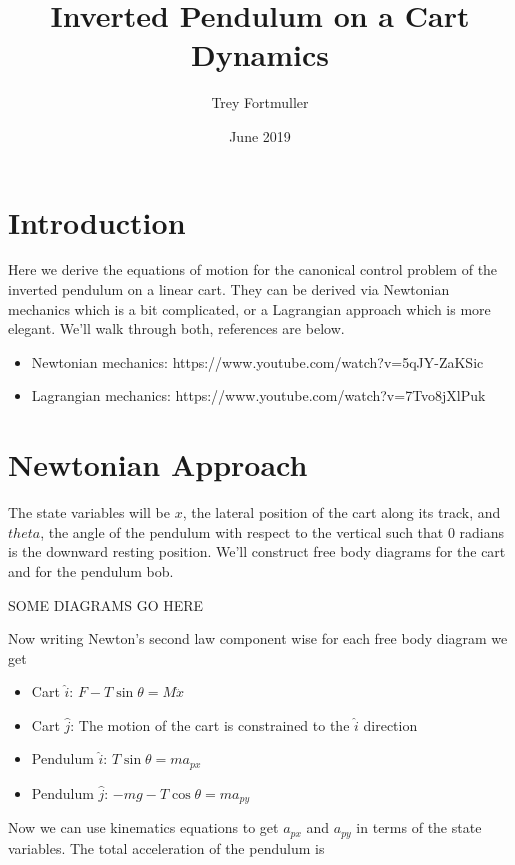 \documentclass{article}
\title{Inverted Pendulum on a Cart Dynamics}
\author{Trey Fortmuller}
\date{June 2019}
\begin{document}
\maketitle

\section*{Introduction}

Here we derive the equations of motion for the canonical control problem of the inverted pendulum on a linear cart. They can be derived via Newtonian mechanics which is a bit complicated, or a Lagrangian approach which is more elegant. We'll walk through both, references are below.

\begin{itemize}
    \item Newtonian mechanics: https://www.youtube.com/watch?v=5qJY-ZaKSic
    \item Lagrangian mechanics: https://www.youtube.com/watch?v=7Tvo8jXlPuk
\end{itemize}

\section*{Newtonian Approach}

The state variables will be $x$, the lateral position of the cart along its track, and $theta$, the angle of the pendulum with respect to the vertical such that 0 radians is the downward resting position. We'll construct free body diagrams for the cart and for the pendulum bob.

SOME DIAGRAMS GO HERE

Now writing Newton's second law component wise for each free body diagram we get

\begin{itemize}
    \item Cart $\hat{i}$: $F - T\sin{\theta} = M\ddot{x}$
    \item Cart $\hat{j}$: The motion of the cart is constrained to the $\hat{i}$ direction
    \item Pendulum $\hat{i}$: $T\sin{\theta} = ma_{px}$
    \item Pendulum $\hat{j}$: $-mg - T\cos{\theta} = ma_{py}$
\end{itemize}

Now we can use kinematics equations to get $a_{px}$ and $a_{py}$ in terms of the state variables. The total acceleration of the pendulum is
\end{document}
